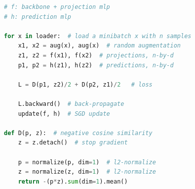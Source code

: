 \documentclass[final]{cvpr}
\begin{document}
\begin{algorithm}[t]
\caption{SimSiam Pseudocode, PyTorch-like}
\label{alg:code}
\begin{lstlisting}[language=python]
# f: backbone + projection mlp
# h: prediction mlp

for x in loader:  # load a minibatch x with n samples
    x1, x2 = aug(x), aug(x)  # random augmentation
    z1, z2 = f(x1), f(x2)  # projections, n-by-d
    p1, p2 = h(z1), h(z2)  # predictions, n-by-d

    L = D(p1, z2)/2 + D(p2, z1)/2   # loss

    L.backward()  # back-propagate
    update(f, h)  # SGD update

def D(p, z):  # negative cosine similarity
    z = z.detach()  # stop gradient

    p = normalize(p, dim=1)  # l2-normalize
    z = normalize(z, dim=1)  # l2-normalize
    return -(p*z).sum(dim=1).mean()
\end{lstlisting}
\end{algorithm}
\end{document}
